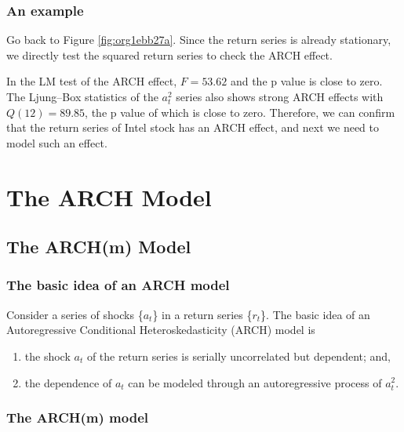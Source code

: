 \documentclass[a4paper,11pt]{article}
\begin{document}
\subsubsection*{An example}
\label{sec:org07cceb1}

Go back to Figure \ref{fig:org1ebb27a}. Since the return series is
already stationary, we directly test the squared return series to
check the ARCH effect. 

In the LM test of the ARCH effect, \(F = 53.62\) and the p value is
close to zero. The Ljung–Box statistics of the \(a^2_t\) series also
shows strong ARCH effects with \(Q(12) = 89.85\), the p value of which is
close to zero. Therefore, we can confirm that the return series of
Intel stock has an ARCH effect, and next we need to model such an
effect. 


\section{The ARCH Model}
\label{sec:orgc1f25c6}

\subsection{The ARCH(m) Model}
\label{sec:orgf222813}

\subsubsection*{The basic idea of an ARCH model}
\label{sec:org8558deb}

Consider a series of shocks \{\(a_t\)\} in a return series \{\(r_t\)\}. The
basic idea of an Autoregressive Conditional Heteroskedasticity (ARCH)
model is
\begin{enumerate}
\item the shock \(a_t\) of the return series is serially uncorrelated but
dependent; and,
\item the dependence of \(a_t\) can be modeled through an autoregressive
process of \(a^2_t\).
\end{enumerate}

\subsubsection*{The ARCH(m) model}
\label{sec:orgcdf0431}
\end{document}
